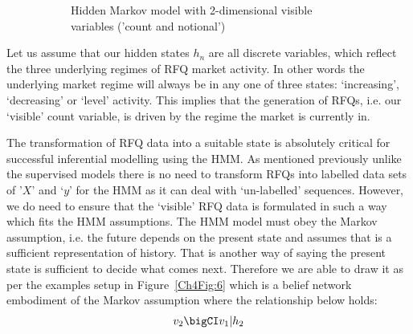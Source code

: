 \begin{figure}[!ht]
\begin{subfigure}[t]{.475\linewidth}
        \caption{Hidden Markov model with \mbox{2-dimensional} visible variables ('count and notional')}\label{Ch4Fig:67}
    \end{subfigure}
    \caption{}\label{Ch4Fig:678}
\end{figure}


Let us assume that our hidden states $h_n$ are all discrete variables, which reflect the three underlying regimes of RFQ market activity. In other words the underlying market regime will always be in any one of three states: `increasing', `decreasing' or `level' activity. This implies that the generation of RFQs, i.e. our `visible' count variable, is driven by the regime the market is currently in.

The transformation of RFQ data into a suitable state is absolutely critical for successful inferential modelling using the HMM. As mentioned previously unlike the supervised models there is no need to transform RFQs into labelled data sets of '$X$' and `$y$' for the HMM as it can deal with `un-labelled' sequences. However, we do need to ensure that the `visible' RFQ data is formulated in such a way which fits the HMM assumptions. The HMM model must obey the Markov assumption, i.e. the future depends on the present state and assumes that is a sufficient representation of history. That is another way of saying the present state is sufficient to decide what comes next. Therefore we are able to draw it as per the examples setup in Figure~\ref{Ch4Fig:6} which is a belief network embodiment of the Markov assumption where the relationship below holds:
\begin{equation}
    v_2 \bigCI v_1 | h_2
\end{equation}

